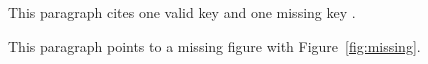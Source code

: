 \documentclass{article}
\begin{document}
This paragraph cites one valid key and one missing key \cite{valid2024,missing2024}.

This paragraph points to a missing figure with Figure~\ref{fig:missing}.
\end{document}
